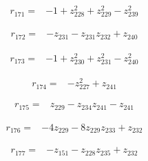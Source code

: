 \par\noindent\begin{minipage}{\linewidth}
\begin{align*}
r_{171}={}&-1+z_{228}^{2}+z_{229}^{2}-z_{239}^{2}
\end{align*}
\end{minipage}\par
\par\noindent\begin{minipage}{\linewidth}
\begin{align*}
r_{172}={}&-z_{231}-z_{231}z_{232}+z_{240}
\end{align*}
\end{minipage}\par
\par\noindent\begin{minipage}{\linewidth}
\begin{align*}
r_{173}={}&-1+z_{230}^{2}+z_{231}^{2}-z_{240}^{2}
\end{align*}
\end{minipage}\par
\par\noindent\begin{minipage}{\linewidth}
\begin{align*}
r_{174}={}&-z_{227}^{2}+z_{241}
\end{align*}
\end{minipage}\par
\par\noindent\begin{minipage}{\linewidth}
\begin{align*}
r_{175}={}&z_{229}-z_{234}z_{241}-z_{241}
\end{align*}
\end{minipage}\par
\par\noindent\begin{minipage}{\linewidth}
\begin{align*}
r_{176}={}&-4z_{229}-8z_{229}z_{233}+z_{232}
\end{align*}
\end{minipage}\par
\par\noindent\begin{minipage}{\linewidth}
\begin{align*}
r_{177}={}&-z_{151}-z_{228}z_{235}+z_{232}
\end{align*}
\end{minipage}\par
